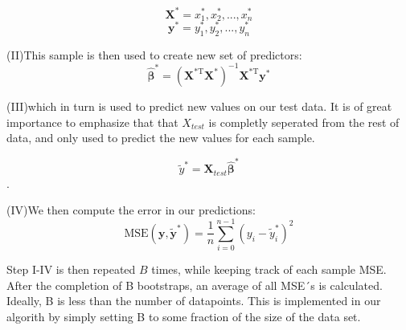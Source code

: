 \documentclass[11pt, a4paper]{article}
\begin{document}
$$\bm{X^*} = x_{1}^{*}, x_{2}^{*}, ... ,x_{n}^{*}$$
$$\bm{y}^*= y_{1}^{*}, y_{2}^{*}, ... ,y_{n}^{*}$$

(II)This sample is then used to create new set of predictors:
\[
  \bm{\hat{\beta}}^* = \left(\bm{X}^\text{*T}\bm{X}^*\right)^{-1}\bm{X}^\text{*T}\bm{y}^*
\]

(III)which in turn is used to predict new values on our test data. It is of great importance to emphasize that that $X_{test}$ is completly seperated from the rest of data, and only used to predict the new values for each sample.


$$\tilde{y}^* = \bm{X}_{test}\bm{\hat{\beta}^*}$$.

(IV)We then compute the error in our predictions:
\[
  \text{MSE}(\boldsymbol{y},\boldsymbol{\tilde{y}^*}) = \frac{1}{n}
  \sum_{i=0}^{n-1}(y_i-\tilde{y}^{*}_i)^2
\]

Step I-IV is then repeated $B$ times, while keeping track of each sample MSE. After the completion of B bootstraps, an average of all MSE´s is calculated. Ideally, B is less than the number of datapoints. This is implemented in our algorith by simply setting B to some fraction of the size of the data set.
\end{document}
